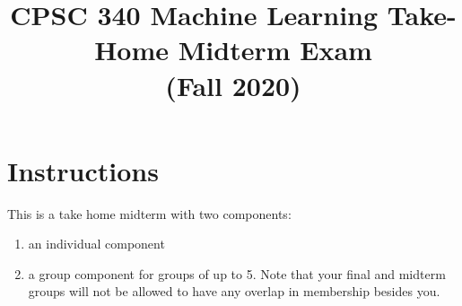 \newcommand{\fig}[2]{\texttt{[image: \#2]}}
\newcommand{\centerfig}[2]{\begin{center}\texttt{[image: \#2]}\end{center}}
\def\items#1{\begin{itemize}#1\end{itemize}}
\def\enum#1{\begin{enumerate}#1\end{enumerate}}



\title{CPSC 340 Machine Learning Take-Home Midterm Exam\\ (Fall 2020)}
\date{}
\maketitle
\vspace{-5em}



\section*{Instructions}
This is a take home midterm with two components:\enum{
	\item an individual component 
	\item a group component for groups of up to 5.  Note that your final and midterm groups will not be allowed to have any overlap in membership besides you.
}


